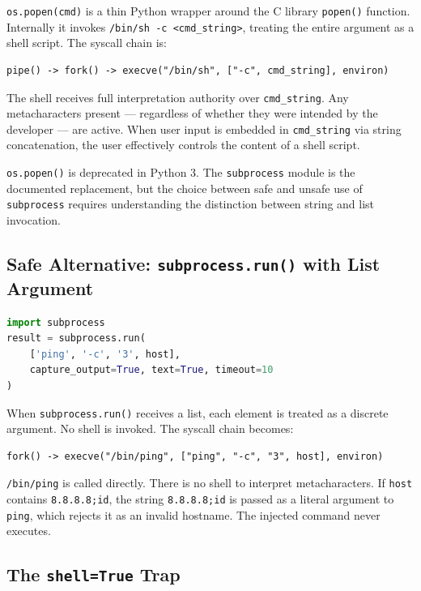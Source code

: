 \texttt{os.popen(cmd)} is a thin Python wrapper around the C library \texttt{popen()} function. Internally it invokes \texttt{/bin/sh -c <cmd\_string>}, treating the entire argument as a shell script. The syscall chain is:

\begin{lstlisting}
pipe() -> fork() -> execve("/bin/sh", ["-c", cmd_string], environ)
\end{lstlisting}

The shell receives full interpretation authority over \texttt{cmd\_string}. Any metacharacters present --- regardless of whether they were intended by the developer --- are active. When user input is embedded in \texttt{cmd\_string} via string concatenation, the user effectively controls the content of a shell script.

\texttt{os.popen()} is deprecated in Python 3. The \texttt{subprocess} module is the documented replacement, but the choice between safe and unsafe use of \texttt{subprocess} requires understanding the distinction between string and list invocation.

\subsection{Safe Alternative: \texttt{subprocess.run()} with List Argument}

\begin{lstlisting}[language=Python]
import subprocess
result = subprocess.run(
    ['ping', '-c', '3', host],
    capture_output=True, text=True, timeout=10
)
\end{lstlisting}

When \texttt{subprocess.run()} receives a list, each element is treated as a discrete argument. No shell is invoked. The syscall chain becomes:

\begin{lstlisting}
fork() -> execve("/bin/ping", ["ping", "-c", "3", host], environ)
\end{lstlisting}

\texttt{/bin/ping} is called directly. There is no shell to interpret metacharacters. If \texttt{host} contains \texttt{8.8.8.8;id}, the string \texttt{8.8.8.8;id} is passed as a literal argument to \texttt{ping}, which rejects it as an invalid hostname. The injected command never executes.

\subsection{The \texttt{shell=True} Trap}

